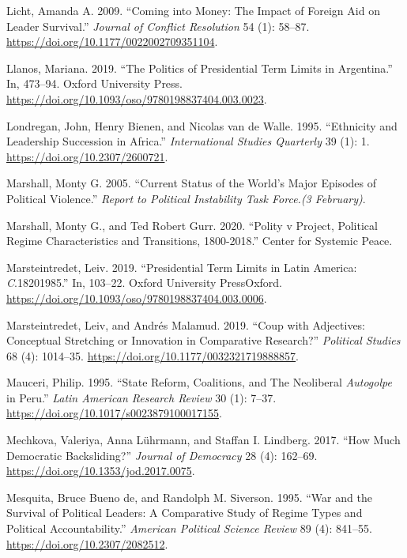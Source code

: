\documentclass[
  12pt,
]{report}
\newlength{\cslhangindent}
\newenvironment{CSLReferences}[2] %
 {\begin{list}{}{%
  \setlength{\itemindent}{0pt}
  \setlength{\leftmargin}{0pt}
  \setlength{\parsep}{0pt}
  \ifodd #1
   \setlength{\leftmargin}{\cslhangindent}
   \setlength{\itemindent}{-1\cslhangindent}
  \fi
  \setlength{\itemsep}{#2\baselineskip}}}
 {\end{list}}
\begin{document}
\begin{CSLReferences}{1}{0}
Licht, Amanda A. 2009. {``Coming into Money: The Impact of Foreign Aid
on Leader Survival.''} \emph{Journal of Conflict Resolution} 54 (1):
58--87. \url{https://doi.org/10.1177/0022002709351104}.

Llanos, Mariana. 2019. {``The Politics of Presidential Term Limits in
Argentina.''} In, 473--94. Oxford University Press.
\url{https://doi.org/10.1093/oso/9780198837404.003.0023}.

Londregan, John, Henry Bienen, and Nicolas van de Walle. 1995.
{``Ethnicity and Leadership Succession in Africa.''} \emph{International
Studies Quarterly} 39 (1): 1. \url{https://doi.org/10.2307/2600721}.

Marshall, Monty G. 2005. {``Current Status of the World's Major Episodes
of Political Violence.''} \emph{Report to Political Instability Task
Force.(3 February)}.

Marshall, Monty G., and Ted Robert Gurr. 2020. {``Polity v Project,
Political Regime Characteristics and Transitions, 1800-2018.''} Center
for Systemic Peace.

Marsteintredet, Leiv. 2019. {``Presidential Term Limits in Latin
America: {\emph{C}}.1820{\textendash}1985.''} In, 103--22. Oxford
University PressOxford.
\url{https://doi.org/10.1093/oso/9780198837404.003.0006}.

Marsteintredet, Leiv, and Andrés Malamud. 2019. {``Coup with Adjectives:
Conceptual Stretching or Innovation in Comparative Research?''}
\emph{Political Studies} 68 (4): 1014--35.
\url{https://doi.org/10.1177/0032321719888857}.

Mauceri, Philip. 1995. {``State Reform, Coalitions, and The Neoliberal
{\emph{Autogolpe}} in Peru.''} \emph{Latin American Research Review} 30
(1): 7--37. \url{https://doi.org/10.1017/s0023879100017155}.

Mechkova, Valeriya, Anna Lührmann, and Staffan I. Lindberg. 2017. {``How
Much Democratic Backsliding?''} \emph{Journal of Democracy} 28 (4):
162--69. \url{https://doi.org/10.1353/jod.2017.0075}.

Mesquita, Bruce Bueno de, and Randolph M. Siverson. 1995. {``War and the
Survival of Political Leaders: A Comparative Study of Regime Types and
Political Accountability.''} \emph{American Political Science Review} 89
(4): 841--55. \url{https://doi.org/10.2307/2082512}.


\end{CSLReferences}
\end{document}
